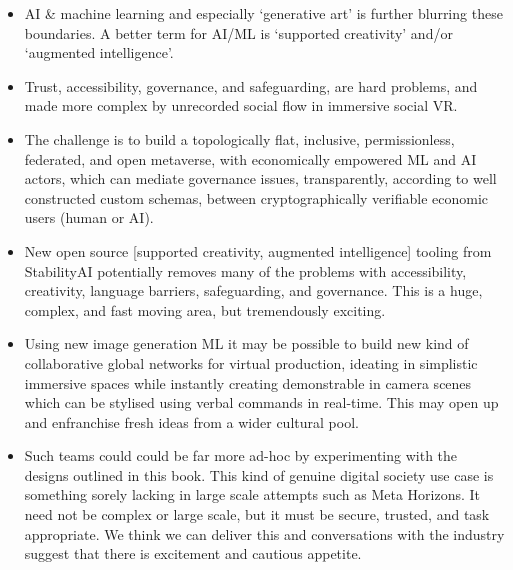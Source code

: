 \begin{itemize}
\item AI \& machine learning and especially `generative art' is further blurring these boundaries. A better term for AI/ML is `supported creativity' and/or `augmented intelligence'.
\item Trust, accessibility, governance, and safeguarding, are hard problems, and made more complex by unrecorded social flow in immersive social VR.
\item The challenge is to build a topologically flat, inclusive, permissionless, federated, and open metaverse, with economically empowered ML and AI actors, which can mediate governance issues, transparently, according to well constructed custom schemas, between cryptographically verifiable economic users (human or AI).
\item New open source [supported creativity, augmented intelligence] tooling from StabilityAI potentially removes many of the problems with accessibility, creativity, language barriers, safeguarding, and governance. This is a huge, complex, and fast moving area, but tremendously exciting. 
\item Using new image generation ML it may be possible to build new kind of collaborative global networks for virtual production, ideating in simplistic immersive spaces while instantly creating demonstrable in camera scenes which can be stylised using verbal commands in real-time. This may open up and enfranchise fresh ideas from a wider cultural pool.
\item Such teams could could be far more ad-hoc by experimenting with the designs outlined in this book. This kind of genuine digital society use case is something sorely lacking in large scale attempts such as Meta Horizons. It need not be complex or large scale, but it must be secure, trusted, and task appropriate. We think we can deliver this and conversations with the industry suggest that there is excitement and cautious appetite. 
\end{itemize}

